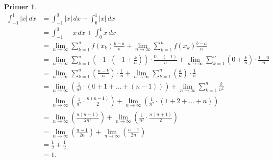 \documentclass[11pt]{article}
\newcounter{mathitem}
\theoremstyle{plain}
\newtheorem{primer}[mathitem]{Primer}
\theoremstyle{serbnodot}
\begin{document}
\begin{primer}
  \begin{align*}
    \int_{-1}^{1} |x| \, dx 
    &= \int_{-1}^{0} |x| \, dx + \int_{0}^{1} |x| \, dx \\
    &= \int_{-1}^{0} -x \, dx + \int_{0}^{1} x \, dx \\
    &= \lim_{n \to \infty} \sum_{k=1}^{n} f(x_k) \frac{b-a}{n}
     + \lim_{n \to \infty} \sum_{k=1}^{n} f(x_k) \frac{b-a}{n} \\
    &= \lim_{n \to \infty} \sum_{k=1}^{n} \left(-1 \cdot \left(-1 + \frac{k}{n}\right)\right) \cdot \frac{0-(-1)}{n}
    + \lim_{n \to \infty} \sum_{k=1}^{n} \left(0 + \frac{k}{n}\right) \cdot \frac{1-0}{n} \\
    &= \lim_{n \to \infty} \sum_{k=1}^{n} \left(\frac{n - k}{n}\right) \cdot \frac{1}{n}
    + \lim_{n \to \infty} \sum_{k=1}^{n} \left(\frac{k}{n}\right) \cdot \frac{1}{n} \\[4pt]
    &= \lim_{n \to \infty} \left(\frac{1}{n^2}\cdot \left(0+1+\ldots+(n-1)\right)\right)
    + \lim_{n \to \infty} \sum_{k=1}^{n} \frac{k}{n^2} \\[4pt]
    &= \lim_{n \to \infty} \left(\frac{1}{n^2} \cdot \frac{n(n-1)}{2} \right)
    + \lim_{n \to \infty} \left(\frac{1}{n^2}\cdot (1+2+\ldots+n)\right) \\
    &= \lim_{n \to \infty} \left(\frac{n(n-1)}{2n^2}\right)
    + \lim_{n \to \infty} \left(\frac{1}{n^2}\cdot \frac{n(n+1)}{2}\right) \\
    &= \lim_{n \to \infty} \left(\frac{n-1}{2n}\right)
    + \lim_{n \to \infty} \left(\frac{n+1}{2n}\right) \\
    &= \frac{1}{2} + \frac{1}{2} \\
    &= 1.
  \end{align*}
\end{primer}
\end{document}

